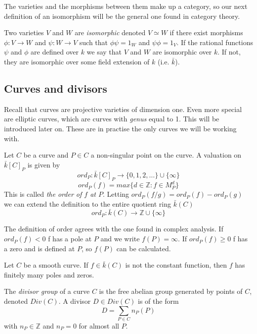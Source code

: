 The varieties and the morphisms between them make up a category, so our next
definition of an isomorphism will be the general one found in category theory.

\begin{mydef}
 Two varieties $V$ and $W$ are \emph{isomorphic} denoted $V\simeq W$
if there exist morphisms $\phi: V \rightarrow W$ and $\psi: W \rightarrow V$ such that
$\phi \psi = 1_W$ and $\psi \phi = 1_V$.
If the rational functions $\psi$ and $\phi$ are defined over $k$ we say that $V$ and $W$
are isomorphic over $k$. If not, they are isomorphic over some field extension of $k$
(i.e. $\bar{k}$).
\end{mydef}


\subsection{Curves and divisors}
Recall that curves are projective varieties of dimension one. Even more special
are elliptic curves, which are curves with \emph{genus} equal to 1. This will
be introduced later on. These are in practise the only curves we will be working with.

\begin{mydef}
 Let $C$ be a curve and $P\in C$ a non-singular point on the curve. A valuation on
$\bar{k}[C]_P$ is given by
$$ ord_P : \bar{k}[C]_P \rightarrow \{ 0, 1, 2, \ldots \} \cup \{ \infty \} $$
$$ ord_P(f) = max \{ d\in \mathbb{Z} : f\in M_P^d \} $$
This is called \emph{the order of $f$ at $P$}.
Letting $ord_P(f/g) = ord_P(f) - ord_P(g)$ we can extend the definition to the entire
quotient ring $\bar{k}(C)$
$$ ord_P: \bar{k}(C) \rightarrow \mathbb{Z}\cup \{\infty \} $$
\end{mydef}

The definition of order agrees with the one found in complex analysis.
If $ord_P(f) < 0$ f has a pole at $P$ and we write $f(P)=\infty$. 
If $ord_P(f) \ge 0$ f has a zero and is defined at $P$, so $f(P)$ can be calculated. 

\begin{prop}
 Let $C$ be a smooth curve. If $f\in \bar{k}(C)$ is not the constant function, then
$f$ has finitely many poles and zeros.
\label{prop:1}
\end{prop}

\begin{mydef}
 The \emph{divisor group} of a curve $C$ is the free abelian group generated by
points of $C$, denoted $Div(C)$. A divisor $D\in Div(C)$ is of the form
$$ D = \sum_{P\in C} n_P(P)$$
with $n_P\in\mathbb{Z}$ and $n_P = 0$ for almost all $P$.
\end{mydef}

